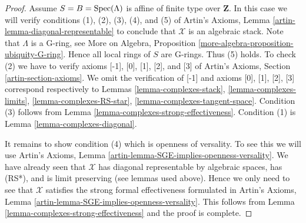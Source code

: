 \begin{proof}
\medskip\noindent
Assume $S = B = \mathop{\mathrm{Spec}}(\Lambda)$ is affine of finite type over $\mathbf{Z}$.
In this case we will verify conditions (1), (2), (3), (4), and (5) of
Artin's Axioms, Lemma \ref{artin-lemma-diagonal-representable}
to conclude that $\mathcal{X}$ is an algebraic stack.
Note that $\Lambda$ is a G-ring, see
More on Algebra, Proposition \ref{more-algebra-proposition-ubiquity-G-ring}.
Hence all local rings of $S$ are G-rings. Thus (5) holds.
To check (2) we have to verify axioms [-1], [0], [1], [2], and [3]
of Artin's Axioms, Section \ref{artin-section-axioms}.
We omit the verification of [-1] and axioms
[0], [1], [2], [3] correspond respectively to
Lemmas \ref{lemma-complexes-stack},
\ref{lemma-complexes-limits},
\ref{lemma-complexes-RS-star},
\ref{lemma-complexes-tangent-space}.
Condition (3) follows from Lemma \ref{lemma-complexes-strong-effectiveness}.
Condition (1) is Lemma \ref{lemma-complexes-diagonal}.

\medskip\noindent
It remains to show condition (4) which is openness of versality.
To see this we will use
Artin's Axioms, Lemma \ref{artin-lemma-SGE-implies-openness-versality}.
We have already seen that $\mathcal{X}$ has diagonal
representable by algebraic spaces, has (RS*), and is limit preserving
(see lemmas used above).
Hence we only need to see that $\mathcal{X}$ satisfies the strong
formal effectiveness formulated in
Artin's Axioms, Lemma \ref{artin-lemma-SGE-implies-openness-versality}.
This follows from Lemma \ref{lemma-complexes-strong-effectiveness}
and the proof is complete.
\end{proof}

















